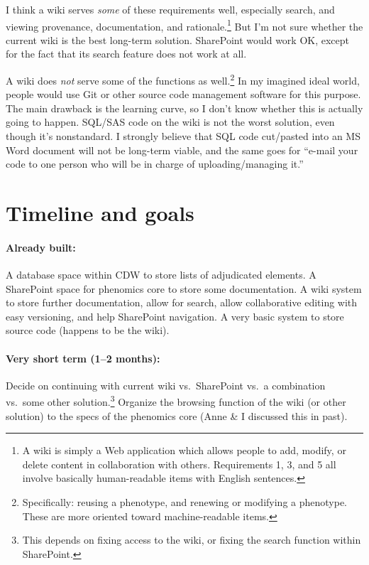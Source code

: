 \documentclass{tufte-handout}
\begin{document}
I think a wiki serves \emph{some} of these requirements
well, especially search, and viewing provenance, documentation, and
rationale.\footnote{A wiki is simply a Web application which allows
  people to add, modify, or delete content in collaboration with
  others. Requirements 1, 3, and 5 all involve basically
  human-readable items with English sentences.} But I'm not sure
whether the current wiki is the best long-term solution. SharePoint
would work OK, except for the fact that its search feature does not
work at all.

A wiki does \emph{not} serve some of the functions as
well.\footnote{Specifically: reusing a phenotype, and renewing or modifying
a phenotype. These are more oriented toward machine-readable items.}
In my imagined ideal world, people would use Git or other source code
management software for this purpose. The main drawback is the
learning curve, so I don't know whether this is actually going to
happen. SQL/SAS code on the wiki is not the worst solution, even
though it's nonstandard. I strongly believe that SQL code cut/pasted
into an MS Word document will not be long-term viable, and the same
goes for ``e-mail your code to one person who will be in charge of
uploading/managing it.''


\section{Timeline and goals}

\paragraph{Already built:}
A database space within CDW to store lists of adjudicated elements. A
SharePoint space for phenomics core to store some documentation. A
wiki system to store further documentation, allow for search, allow
collaborative editing with easy versioning, and help SharePoint
navigation. A very basic system to store source code (happens to be
the wiki).

\paragraph{Very short term (1--2 months):}
Decide on continuing with current wiki vs.\ SharePoint vs.\ a
combination vs.\ some other solution.\footnote{This depends on fixing
  access to the wiki, or fixing the search function within
  SharePoint.} Organize the browsing function of the wiki (or other
solution) to the specs of the phenomics core (Anne \& I discussed this
in past).
\end{document}
